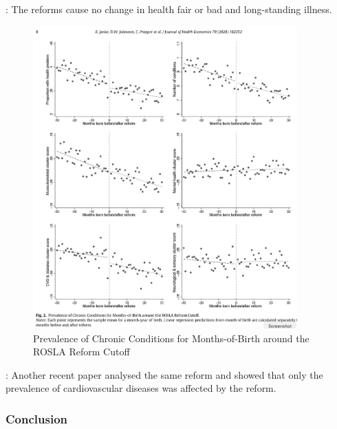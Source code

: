             : The reforms cause no change in health fair or bad and long-standing illness.


            \begin{figure}[H]
                \centering
                \includegraphics[width=4in]{images/ch3/39.png}
                \caption{Prevalence of Chronic Conditions for Months-of-Birth around the ROSLA Reform Cutoff}
                \label{fig:rosla_plot}
            \end{figure} 

            : Another recent paper analysed the same reform and showed that only the prevalence of cardiovascular diseases was affected by the reform.

        \subsubsection{Conclusion}


